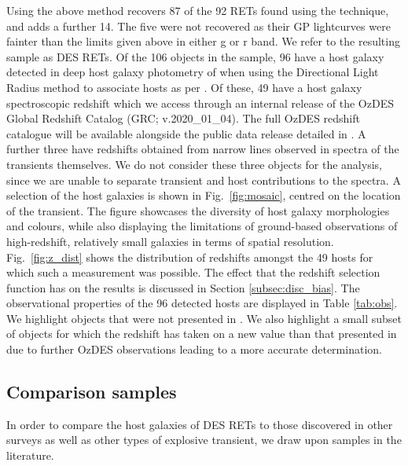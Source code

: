 \documentclass[fleqn,usenatbib,]{mnras}
\begin{document}
Using the above method recovers 87 of the 92 RETs found using the  technique, and adds a further 14. The five were not recovered as their GP lightcurves were fainter than the limits given above in either g or r band.
We refer to the resulting sample as DES RETs. Of the 106 objects in the sample, 96 have a host galaxy detected in deep host galaxy photometry of  when using the Directional Light Radius method \citep{Sullivan2006} to associate hosts as per . Of these, 49 have a host galaxy spectroscopic redshift which we access through an internal release of the OzDES Global Redshift Catalog (GRC; v.2020\_01\_04). The full OzDES redshift catalogue will be available alongside the public data release detailed in \citet{Lidman2020}. A further three have redshifts obtained from narrow lines observed in spectra of the transients themselves. We do not consider these three objects for the analysis, since we are unable to separate transient and host contributions to the spectra.
A selection of the host galaxies is shown in Fig.~\ref{fig:mosaic}, centred on the location of the transient. The figure showcases the diversity of host galaxy morphologies and colours, while also displaying the limitations of ground-based observations of high-redshift, relatively small galaxies in terms of spatial resolution.
Fig.~\ref{fig:z_dist} shows the distribution of redshifts amongst the 49 hosts for which such a measurement was possible. The effect that the redshift selection function has on the results is discussed in Section \ref{subsec:disc_bias}.
The observational properties of the 96 detected hosts are displayed in Table \ref{tab:obs}. We highlight objects that were not presented in . We also highlight a small subset of objects for which the redshift has taken on a new value than that presented in  due to further OzDES observations leading to a more accurate determination. 

\subsection{Comparison samples \label{subsec:comparison}}

In order to compare the host galaxies of DES RETs to those discovered in other surveys as well as other types of explosive transient, we draw upon samples in the literature. 
\end{document}
